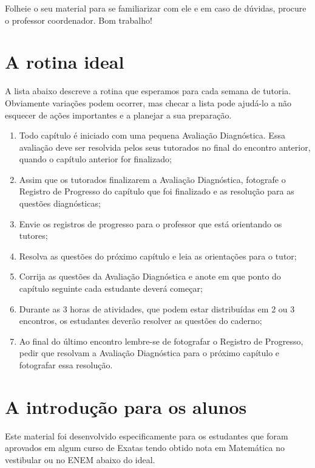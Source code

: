 Folheie o seu material para se familiarizar com ele e em caso de dúvidas, procure o professor coordenador. Bom trabalho!

\section{A rotina ideal}

A lista abaixo descreve a rotina que esperamos para cada semana de tutoria. Obviamente variações podem ocorrer, mas checar a lista pode ajudá-lo a não esquecer de ações importantes e a planejar a sua preparação.

\begin{enumerate}
 \item Todo capítulo é iniciado com uma pequena Avaliação Diagnóstica. Essa avaliação deve ser resolvida pelos seus tutorados no final do encontro anterior, quando o capítulo anterior for finalizado;
 \item Assim que os tutorados finalizarem a Avaliação Diagnóstica, fotografe o Registro de Progresso do capítulo que foi finalizado e as resolução para as questões diagnósticas;
 \item Envie os registros de progresso para o professor que está orientando os tutores;
 \item Resolva as questões do próximo capítulo e leia as orientações para o tutor;
 \item Corrija as questões da Avaliação Diagnóstica e anote em que ponto do capítulo seguinte cada estudante deverá começar;
 \item Durante as 3 horas de atividades, que podem estar distribuídas em 2 ou 3 encontros, os estudantes deverão resolver as questões do caderno;
 \item Ao final do último encontro lembre-se de fotografar o Registro de Progresso, pedir que resolvam a Avaliação Diagnóstica para o próximo capítulo e fotografar essa resolução.
\end{enumerate}

\section{A introdução para os alunos}

\paraAlunos

Este material foi desenvolvido especificamente para os estudantes que foram aprovados em algum curso de Exatas tendo obtido nota em Matemática no vestibular ou no ENEM abaixo do ideal.

